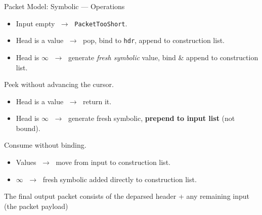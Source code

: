 \documentclass[aspectratio=169]{beamer}
\begin{document}
\begin{hidden}





\begin{frame}{Packet Model: Symbolic — Operations}

  \begin{description}
    \item[\texttt{extract(hdr)}]
      \begin{itemize}
        \item Input empty $\;\to\;$
              \texttt{\textcolor{red!70!black}{PacketTooShort}}.
        \item Head is a value $\;\to\;$ pop, bind to \texttt{hdr},
              append to construction list.
        \item Head is $\infty$ $\;\to\;$ generate \emph{fresh symbolic}
              value, bind \& append to construction list.
      \end{itemize}

    \medskip
    \item[\texttt{lookahead}]
      Peek without advancing the cursor.
      \begin{itemize}
        \item Head is a value $\;\to\;$ return it.
        \item Head is $\infty$ $\;\to\;$ generate fresh symbolic,
              \textbf{prepend to input list} (not bound).
      \end{itemize}

    \medskip
    \item[\texttt{advance}]
      Consume without binding.
      \begin{itemize}
        \item Values $\;\to\;$ move from input to construction list.
        \item $\infty$ $\;\to\;$ fresh symbolic added directly to
              construction list.
      \end{itemize}
  The final output packet consists of the deparsed header + any remaining input (the packet payload)
  \end{description}
\end{frame}


\end{hidden}
\end{document}
